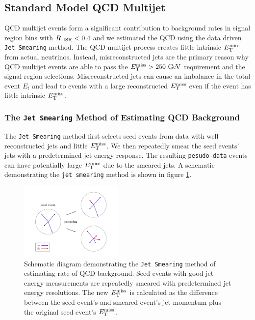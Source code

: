 \subsection{Standard Model QCD Multijet}
\label{sec:Bkg:QCD}

\indent  QCD multijet events form a significant contribution to background rates in signal region bins with $R_{~\mathrm{ISR}} < 0.4$ and we estimated the QCD using the data driven {\tt Jet Smearing} method.  The QCD multijet process creates little intrinsic $E_{\mathrm{T}}^{\mathrm{miss}}$ from actual neutrinos. Instead, misreconstructed jets are the primary reason why QCD multijet events are able to pass the $\met > 250 \gev$ requirement and the signal region selections.  Misreconstructed jets can cause an imbalance in the total event $E_t$ and lead to events with a large reconstructed $E_{\mathrm{T}}^{\mathrm{miss}}$ even if the event has little intrinsic $E_{\mathrm{T}}^{\mathrm{miss}}$.   \\

\subsubsection{The {\tt Jet Smearing} Method of Estimating QCD Background}

\indent The {\tt Jet Smearing} method first selects seed events from data with well reconstructed jets and little $E_{\mathrm{T}}^{\mathrm{miss}}$.  We then repeatedly smear the seed events' jets with a predetermined jet energy response.  The resulting {\tt pesudo-data} events can have potentially large $E_{\mathrm{T}}^{\mathrm{miss}}$ due to the smeared jets.  A schematic demonstrating the {\tt jet smearing} method is shown in figure \ref{fig:jetsmearing}.\\

\begin{figure}[h!]
\begin{center}
\includegraphics[width=0.45\textwidth]{figures/QCDJetSmearing/jet_smearing.pdf}
\end{center}
\caption[Schematic diagram demonstrating the {\tt Jet Smearing} method of estimating QCD background]{Schematic diagram demonstrating the {\tt Jet Smearing} method of estimating rate of QCD background.  Seed events with good jet energy measurements are repeatedly smeared with predetermined jet energy resolutions.  The new $E_{\mathrm{T}}^{\mathrm{miss}}$ is calculated as the difference between the seed event's and smeared event's jet momentum plus the original seed event's $E_{\mathrm{T}}^{\mathrm{miss}}$.\cite{JetSmearing} }
\label{fig:jetsmearing}
\end{figure}

